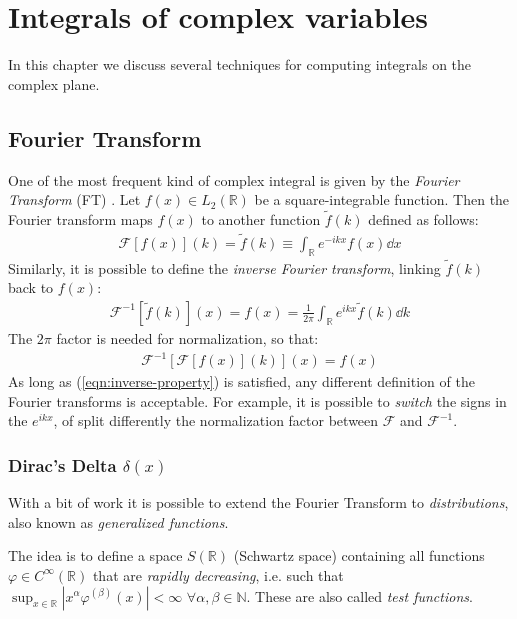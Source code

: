 \documentclass[../template.tex]{subfiles}
\begin{document}
\chapter{Integrals of complex variables}
In this chapter we discuss several techniques for computing integrals on the complex plane.

\section{Fourier Transform}
One of the most frequent kind of complex integral is given by the \textit{Fourier Transform} (FT) . Let $f(x) \in L_2(\mathbb{R})$ be a square-integrable function. Then the Fourier transform maps $f(x)$ to another function $\tilde{f}(k)$ defined as follows: 
\begin{align*}
    \mathcal{F}[f(x)](k) = \tilde{f}(k) \equiv \int_{\mathbb{R}} e^{-ikx} f(x) \dd{x}
\end{align*}
Similarly, it is possible to define the \textit{inverse Fourier transform}, linking $\tilde{f}(k)$ back to $f(x)$: 
\begin{align*}
    \mathcal{F}^{-1}[\tilde{f}(k)](x) = f(x) = \frac{1}{2\pi} \int_{\mathbb{R}} e^{ikx} \tilde{f}(k) \dd{k} 
\end{align*} 
The $2 \pi$ factor is needed for normalization, so that:
\begin{align}
    \mathcal{F}^{-1}[\mathcal{F}[f(x)](k)](x) = f(x) \label{eqn:inverse-property}
\end{align}
As long as (\ref{eqn:inverse-property}) is satisfied, any different  definition of the Fourier transforms is acceptable. For example, it is possible to \textit{switch} the signs in the $e^{ikx}$, of split differently the normalization factor between $\mathcal{F}$ and $\mathcal{F}^{-1}$. 

\subsection{Dirac's Delta $\delta(x)$}
With a bit of work it is possible to extend the Fourier Transform to \textit{distributions}, also known as \textit{generalized functions}.

The idea is to define a space $S(\mathbb{R})$ (Schwartz space) containing all functions $\varphi \in C^{\infty}(\mathbb{R})$ that are \textit{rapidly decreasing}, i.e. such that $\sup_{x \in \mathbb{R}} |x^\alpha \varphi^{(\beta)}(x)| < \infty$ $\forall \alpha, \beta \in \mathbb{N}$. These are also called \textit{test functions}. 
\end{document}
